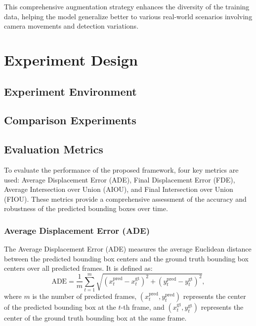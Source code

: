 \documentclass[12pt,oneside]{book} %
\begin{document}
This comprehensive augmentation strategy enhances the diversity of the training
data, helping the model generalize better to various real-world scenarios
involving camera movements and detection variations.

\chapter{Experiment Design}\label{chap:experiment_design}
\section{Experiment Environment}

\section{Comparison Experiments}

\section{Evaluation Metrics}

To evaluate the performance of the proposed framework, four key metrics are
used: Average Displacement Error (ADE), Final Displacement Error (FDE), Average
Intersection over Union (AIOU), and Final Intersection over Union (FIOU). These
metrics provide a comprehensive assessment of the accuracy and robustness of
the predicted bounding boxes over time.

\subsection*{Average Displacement Error (ADE)}
The Average Displacement Error (ADE) measures the average Euclidean distance
between the predicted bounding box centers and the ground truth bounding box
centers over all predicted frames. It is defined as:
\begin{equation}
    \text{ADE} = \frac{1}{m} \sum_{t=1}^{m} \sqrt{(x_t^{\text{pred}} - x_t^{\text{gt}})^2 + (y_t^{\text{pred}} - y_t^{\text{gt}})^2},
\end{equation}
where \(m\) is the number of predicted frames, \((x_t^{\text{pred}}, y_t^{\text{pred}})\) represents the center of the predicted bounding box at the \(t\)-th frame, and \((x_t^{\text{gt}}, y_t^{\text{gt}})\) represents the center of the ground truth bounding box at the same frame.
\end{document}
